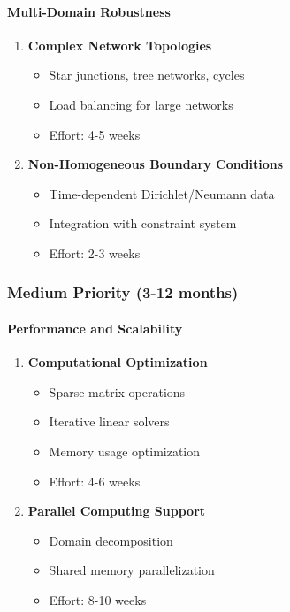 \paragraph{Multi-Domain Robustness}
\begin{enumerate}
    \item \textbf{Complex Network Topologies}
    \begin{itemize}
        \item Star junctions, tree networks, cycles
        \item Load balancing for large networks
        \item Effort: 4-5 weeks
    \end{itemize}
    
    \item \textbf{Non-Homogeneous Boundary Conditions}
    \begin{itemize}
        \item Time-dependent Dirichlet/Neumann data
        \item Integration with constraint system
        \item Effort: 2-3 weeks
    \end{itemize}
\end{enumerate}

\subsubsection{Medium Priority (3-12 months)}

\paragraph{Performance and Scalability}
\begin{enumerate}
    \item \textbf{Computational Optimization}
    \begin{itemize}
        \item Sparse matrix operations
        \item Iterative linear solvers
        \item Memory usage optimization
        \item Effort: 4-6 weeks
    \end{itemize}
    
    \item \textbf{Parallel Computing Support}
    \begin{itemize}
        \item Domain decomposition
        \item Shared memory parallelization
        \item Effort: 8-10 weeks
    \end{itemize}
\end{enumerate}

